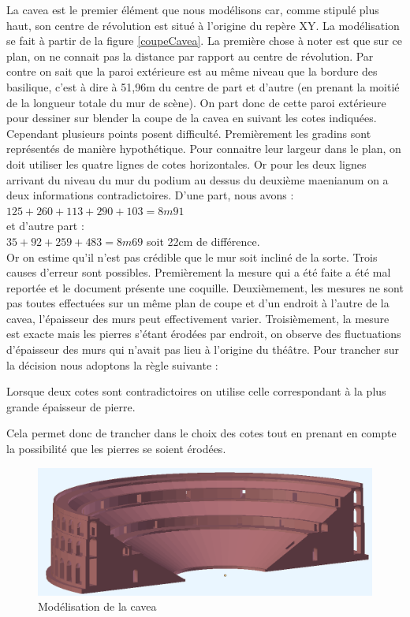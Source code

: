 La \gls{cavea} est le premier élément que nous modélisons car, comme stipulé plus haut, son centre de révolution est situé à l'origine du repère XY. La modélisation se fait à partir de la figure \ref{coupeCavea}. La première chose à noter est que sur ce plan, on ne connait pas la distance par rapport au centre de révolution. Par contre on sait que la paroi extérieure est au même niveau que la bordure des \gls{basilique}, c'est à dire à 51,96m du centre de part et d'autre (en prenant la moitié de la longueur totale du mur de scène). On part donc de cette paroi extérieure pour dessiner sur blender la coupe de la \gls{cavea} en suivant les cotes indiquées. Cependant plusieurs points posent difficulté. Premièrement les gradins sont représentés de manière hypothétique. Pour connaitre leur largeur dans le plan, on doit utiliser les quatre lignes de cotes horizontales. Or pour les deux lignes arrivant du niveau du mur du podium au dessus du deuxième \gls{maenianum} on a deux informations contradictoires. D'une part, nous avons :\\
$125+260+113+290+103=8m91$\\
et d'autre part : \\
$35+92+259+483=8m69$ soit 22cm de différence. \\
Or on estime qu'il n'est pas crédible que le mur soit incliné de la sorte. Trois causes d'erreur sont possibles. Premièrement la mesure qui a été faite a été mal reportée et le document présente une coquille. Deuxièmement, les mesures ne sont pas toutes effectuées sur un même plan de coupe et d'un endroit à l'autre de la cavea, l'épaisseur des murs peut effectivement varier. Troisièmement, la mesure est exacte mais les pierres s'étant érodées par endroit, on observe des fluctuations d'épaisseur des murs qui n'avait pas lieu à l'origine du théâtre. Pour trancher sur la décision nous adoptons la règle suivante :

\begin{theo}\label{epaisseur}
	Lorsque deux cotes sont contradictoires on utilise celle correspondant à la plus grande épaisseur de pierre.
\end{theo}

Cela permet donc de trancher dans le choix des cotes tout en prenant en compte la possibilité que les pierres se soient érodées.

\begin{figure}[!h]
	\includegraphics[width=\linewidth]{images/modCavea}
	\caption{Modélisation de la \gls{cavea}} 
	\label{modCavea} 
\end{figure} 


